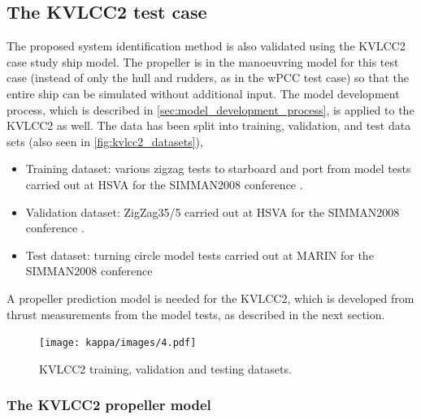 \subsection{The KVLCC2 test case}
\label{\detokenize{05.01_case_studies:the-kvlcc2-test-scenarios}}
The proposed system identification method is also validated using the KVLCC2 case study ship model.
The propeller is in the manoeuvring model for this test case (instead of only the hull and rudders, as in the wPCC test case) so that the entire ship can be simulated without additional input.
The model development process, which is described in \autoref{sec:model_development_process}, is applied to the KVLCC2 as well.
The data has been split into training, validation, and test data sets (also seen in \autoref{fig:kvlcc2_datasets}),
\vspace{5pt}
\begin{itemize}
    \setlength\itemsep{5pt}
    \item Training dataset: various zigzag tests to starboard and port from model tests carried out at HSVA for the SIMMAN2008 conference \cite{stern_experience_2011}.
    \item Validation dataset: ZigZag35/5 carried out at HSVA for the SIMMAN2008 conference \cite{stern_experience_2011}.
    \item Test dataset: turning circle model tests carried out at MARIN for the SIMMAN2008 conference \cite{stern_experience_2011}
\end{itemize}
\vspace{5pt}
\noindent A propeller prediction model is needed for the KVLCC2, which is developed from thrust measurements from the model tests, as described in the next section.
\begin{figure}[h!]
\centering
\texttt{[image: kappa/images/4.pdf]}
\caption{KVLCC2 training, validation and testing datasets.}\label{fig:kvlcc2_datasets}\end{figure}
\subsubsection{The KVLCC2 propeller model}
\label{\detokenize{06.20_results_kvlcc2:the-kvlcc2-propeller-model}}\label{\detokenize{06.20_results_kvlcc2:results-propeller-model}}

